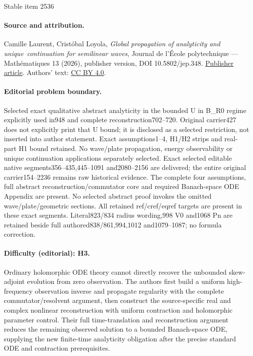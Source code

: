 \documentclass[11pt]{article}
\theoremstyle{definition}
\begin{document}
\begin{center}{\Large Stable item 2536}\end{center}
\paragraph{Source and attribution.}
Camille Laurent, Cristóbal Loyola, \emph{Global propagation of analyticity and unique continuation for semilinear waves}, Journal de l’École polytechnique — Mathématiques 13 (2026), publisher version, DOI 10.5802/jep.348. \href{https://jep.centre-mersenne.org/articles/10.5802/jep.348/}{Publisher article}. Authors' text: \href{https://creativecommons.org/licenses/by/4.0/}{CC BY 4.0}.
\paragraph{Editorial problem boundary.}
Selected exact qualitative abstract analyticity in the bounded U in B\_R0 regime explicitly used in948 and complete reconstruction702–720. Original carrier427 does not explicitly print that U bound; it is disclosed as a selected restriction, not inserted into author statement. Exact assumptions1–4, H1/H2 strips and real-part H1 bound retained. No wave/plate propagation, energy observability or unique continuation applications separately selected. Exact selected editable native segments356–435,445–1091 and2080–2156 are delivered; the entire original carrier154–2236 remains raw historical evidence. The complete four assumptions, full abstract reconstruction/commutator core and required Banach-space ODE Appendix are present. No selected abstract proof invokes the omitted wave/plate/geometric sections. All retained ref/cref/eqref targets are present in these exact segments. Literal823/834 radius wording,998 V0 and1068 Pn are retained beside full authored838/861,994,1012 and1079–1087; no formula correction.
\paragraph{Difficulty (editorial): H3.}
Ordinary holomorphic ODE theory cannot directly recover the unbounded skew-adjoint evolution from zero observation. The authors first build a uniform high-frequency observation inverse and propagate regularity with the complete commutator/resolvent argument, then construct the source-specific real and complex nonlinear reconstruction with uniform contraction and holomorphic parameter control. Their full time-translation and reconstruction argument reduces the remaining observed solution to a bounded Banach-space ODE, supplying the new finite-time analyticity obligation after the precise standard ODE and contraction prerequisites.
\end{document}
